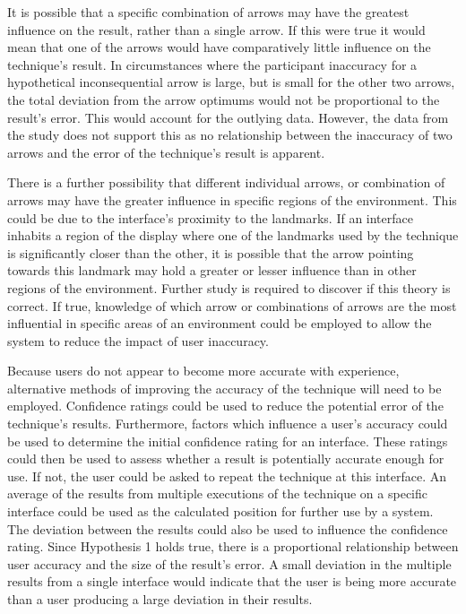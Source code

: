 \documentclass{bmcart}
\begin{document}
It is possible that a specific combination of arrows may have the greatest influence on the result, rather than a single arrow.
If this were true it would mean that one of the arrows would have comparatively little influence on the technique's result.
In circumstances where the participant inaccuracy for a hypothetical inconsequential arrow is large, but is small for the other two arrows, the total deviation from the arrow optimums would not be proportional to the result's error.
This would account for the outlying data.
However, the data from the study does not support this as no relationship between the inaccuracy of two arrows and the error of the technique's result is apparent.

There is a further possibility that different individual arrows, or combination of arrows may have the greater influence in specific regions of the environment.
This could be due to the interface's proximity to the landmarks.
If an interface inhabits a region of the display where one of the landmarks used by the technique is significantly closer than the other, it is possible that the arrow pointing towards this landmark may hold a greater or lesser influence than in other regions of the environment.
Further study is required to discover if this theory is correct.
If true, knowledge of which arrow or combinations of arrows are the most influential in specific areas of an environment could be employed to allow the system to reduce the impact of user inaccuracy.

Because users do not appear to become more accurate with experience, alternative methods of improving the accuracy of the technique will need to be employed.
Confidence ratings could be used to reduce the potential error of the technique's results.
Furthermore, factors which influence a user's accuracy could be used to determine the initial confidence rating for an interface.
These ratings could then be used to assess whether a result is potentially accurate enough for use.
If not, the user could be asked to repeat the technique at this interface.
An average of the results from multiple executions of the technique on a specific interface could be used as the calculated position for further use by a system.
The deviation between the results could also be used to influence the confidence rating.
Since Hypothesis 1 holds true, there is a proportional relationship between user accuracy and the size of the result's error.
A small deviation in the multiple results from a single interface would indicate that the user is being more accurate than a user producing a large deviation in their results.
\end{document}
